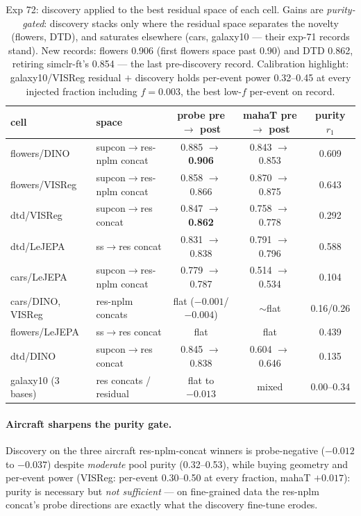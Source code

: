 \documentclass[11pt]{article}
\newcommand{\best}[1]{\textbf{#1}}
\begin{document}
\begin{table}[h]\centering\small
\setlength{\tabcolsep}{5pt}
\begin{tabular}{ll cc c}
\toprule
cell & space & probe pre $\to$ post & mahaT pre $\to$ post & purity $r_1$ \\
\midrule
flowers/DINO & supcon$\to$res-nplm concat & 0.885 $\to$ \best{0.906} & 0.843 $\to$ 0.853 & 0.609 \\
flowers/VISReg & supcon$\to$res-nplm concat & 0.858 $\to$ 0.866 & 0.870 $\to$ 0.875 & 0.643 \\
dtd/VISReg & supcon$\to$res concat & 0.847 $\to$ \best{0.862} & 0.758 $\to$ 0.778 & 0.292 \\
dtd/LeJEPA & ss$\to$res concat & 0.831 $\to$ 0.838 & 0.791 $\to$ 0.796 & 0.588 \\
cars/LeJEPA & supcon$\to$res-nplm concat & 0.779 $\to$ 0.787 & 0.514 $\to$ 0.534 & 0.104 \\
cars/DINO, VISReg & res-nplm concats & flat ($-0.001$/$-0.004$) & $\sim$flat & 0.16/0.26 \\
flowers/LeJEPA & ss$\to$res concat & flat & flat & 0.439 \\
dtd/DINO & supcon$\to$res concat & 0.845 $\to$ 0.838 & 0.604 $\to$ 0.646 & 0.135 \\
galaxy10 (3 bases) & res concats / residual & flat to $-0.013$ & mixed & 0.00--0.34 \\
\bottomrule
\end{tabular}
\caption{Exp 72: discovery applied to the best residual space of each
cell.  Gains are \emph{purity-gated}: discovery stacks only where the
residual space separates the novelty (flowers, DTD), and saturates
elsewhere (cars, galaxy10 --- their exp-71 records stand).  New records:
flowers 0.906 (first flowers space past 0.90) and DTD 0.862, retiring
simclr-ft's 0.854 --- the last pre-discovery record.  Calibration
highlight: galaxy10/VISReg residual $+$ discovery holds per-event power
0.32--0.45 at every injected fraction including $f{=}0.003$, the best
low-$f$ per-event on record.}
\end{table}

\paragraph{Aircraft sharpens the purity gate.}
Discovery on the three aircraft res-nplm-concat winners is
probe-negative ($-0.012$ to $-0.037$) despite \emph{moderate} pool
purity (0.32--0.53), while buying geometry and per-event power
(VISReg: per-event 0.30--0.50 at every fraction, mahaT $+0.017$):
purity is necessary but \emph{not sufficient} --- on fine-grained data
the res-nplm concat's probe directions are exactly what the discovery
fine-tune erodes.
\end{document}
